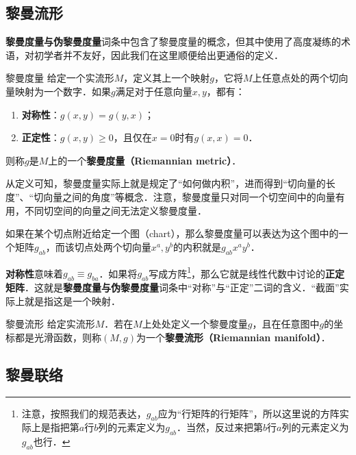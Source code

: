 

\subsection{黎曼流形}

\textbf{黎曼度量与伪黎曼度量}词条中包含了黎曼度量的概念，但其中使用了高度凝练的术语，对初学者并不友好，因此我们在这里顺便给出更通俗的定义．

\begin{definition}{黎曼度量}
给定一个实流形$M$，定义其上一个映射$g$，它将$M$上任意点处的两个切向量映射为一个数字．如果$g$满足对于任意向量$x, y$，都有：
\begin{enumerate}
\item \textbf{对称性}：$g(x, y)=g(y, x)$；
\item \textbf{正定性}：$g(x, y)\geq 0$，且仅在$x=0$时有$g(x, x)=0$．
\end{enumerate}
则称$g$是$M$上的一个\textbf{黎曼度量（Riemannian metric）}．
\end{definition}

从定义可知，黎曼度量实际上就是规定了“如何做内积”，进而得到“切向量的长度”、“切向量之间的角度”等概念．注意，黎曼度量只对同一个切空间中的向量有用，不同切空间的向量之间无法定义黎曼度量．

如果在某个切点附近给定一个图（chart），那么黎曼度量可以表达为这个图中的一个矩阵$g_{ab}$，而该切点处两个切向量$x^a, y^b$的内积就是$g_{ab}x^ay^b$．

\textbf{对称性}意味着$g_{ab}\equiv g_{ba}$．如果将$g_{ab}$写成方阵\footnote{注意，按照我们的规范表达，$g_{ab}$应为“行矩阵的行矩阵”，所以这里说的方阵实际上是指把第$a$行$b$列的元素定义为$g_{ab}$．当然，反过来把第$b$行$a$列的元素定义为$g_{ab}$也行．}，那么它就是线性代数中讨论的\textbf{正定矩阵}．这就是\textbf{黎曼度量与伪黎曼度量}词条中“对称”与“正定”二词的含义．“截面”实际上就是指这是一个映射．


\begin{definition}{黎曼流形}
给定实流形$M$．若在$M$上处处定义一个黎曼度量$g$，且在任意图中$g$的坐标都是光滑函数，则称$(M, g)$为一个\textbf{黎曼流形（Riemannian manifold）}．
\end{definition}





\subsection{黎曼联络}

